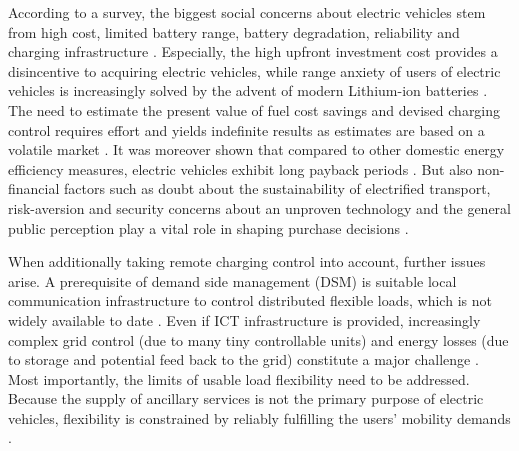 According to a survey, the biggest social concerns about electric vehicles stem from high cost, limited battery range, battery degradation, reliability and charging infrastructure \cite{Egbue2012}. Especially, the high upfront investment cost provides a disincentive to acquiring electric vehicles, while range anxiety of users of electric vehicles is increasingly solved by the advent of modern Lithium-ion batteries \cite{Tan2016a}. The need to estimate the present value of fuel cost savings and devised charging control requires effort and yields indefinite results as estimates are based on a volatile market \cite{Sovacool2009}. It was moreover shown that compared to other domestic energy efficiency measures, electric vehicles exhibit long payback periods \cite{Sovacool2009}. But also non-financial factors such as doubt about the sustainability of electrified transport, risk-aversion and security concerns about an unproven technology and the general public perception play a vital role in shaping purchase decisions \cite{Egbue2012}.

When additionally taking remote charging control into account, further issues arise. A prerequisite of demand side management (DSM) is suitable local communication infrastructure to control distributed flexible loads, which is not widely available to date \cite{Budka2014}. Even if ICT infrastructure is provided, increasingly complex grid control (due to many tiny controllable units) and energy losses (due to storage and potential feed back to the grid) constitute a major challenge \cite{Strbac2008, Dehaghani2012}. Most importantly, the limits of usable load flexibility need to be addressed. Because the supply of ancillary services is not the primary purpose of electric vehicles, flexibility is constrained by reliably fulfilling the users' mobility demands \cite{Dehaghani2012}. 

